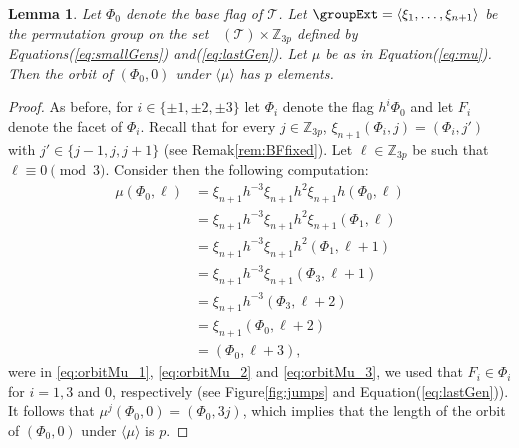 \documentclass[final]{amsart}
\theoremstyle{plain}
\newtheorem{lem}[thm]{Lemma}
\theoremstyle{definition}
\theoremstyle{remark}
\numberwithin{equation}{section}
\renewcommand{\{}{\lbrace}
\renewcommand{\}}{\rbrace}
\newcommand{\bZ}{\mathbb{Z}}
\newcommand{\cT}{\mathcal{T}}
\DeclareMathOperator{\Fw}{\mathcal{F}^{w}}
\newcommand{\kng}{{h}}
\newcommand{\te}{\xi}
\begin{document}
\begin{lem}\label{lem:orbitMu}
 Let $\Phi_{0}$ denote the base flag of $\cT$. Let $\groupExt = \left\langle \te_{1}, \dots, \te_{n+1} \right\rangle $ be the permutation group on the set $\Fw(\cT) \times \bZ_{3p}$ defined by Equations\nobreakspace \textup {(\ref {eq:smallGens})} and\nobreakspace  \textup {(\ref {eq:lastGen})}.
 Let $\mu$ be as in Equation\nobreakspace \textup {(\ref {eq:mu})}.
 Then the orbit of $(\Phi_{0}, 0)$ under $\langle \mu \rangle$ has $p$ elements.
\end{lem}
\begin{proof} 
    As before, for $i\in\{\pm1, \pm 2, \pm 3\}$ let $\Phi_i$ denote the flag $\kng^{i}\Phi_0$ and let $F_i$ denote the facet of $\Phi_i$.
    Recall that for every $j  \in \bZ_{3p}$,  $\te_{n+1}(\Phi_{i},j) = (\Phi_{i},j')$ with $j' \in \{j-1, j , j+1\}$ (see Remak\nobreakspace \ref {rem:BFfixed}).
    Let $\ell \in \bZ_{3p}$ be such that $\ell \equiv 0 \pmod{3}$.
  Consider then the following computation:
\begin{subequations}
 \begin{align}
  \mu(\Phi_{0},\ell)
  &= \te_{n+1} \kng^{-3} \te_{n+1} \kng^{2} \te_{n+1} \kng (\Phi_{0}, \ell) \nonumber \\
  &= \te_{n+1} \kng^{-3} \te_{n+1} \kng^{2} \te_{n+1} (\Phi_{1}, \ell)  \nonumber \\
  &= \te_{n+1} \kng^{-3} \te_{n+1} \kng^{2}  (\Phi_{1}, \ell+1)  \label{eq:orbitMu_1}  \\
&= \te_{n+1} \kng^{-3} \te_{n+1}  (\Phi_{3}, \ell+1)  \nonumber  \\
  &= \te_{n+1} \kng^{-3}   (\Phi_{3}, \ell+2)   \label{eq:orbitMu_2} \\
&= \te_{n+1}   ( \Phi_{0}, \ell+2)  \nonumber \\
  &= (\Phi_{0}, \ell+3),  \label{eq:orbitMu_3} 
\end{align}
\end{subequations}
were in \eqref{eq:orbitMu_1}, \eqref{eq:orbitMu_2} and \eqref{eq:orbitMu_3}, we used that $F_{i} \in \Phi_{i}$ for $i = 1, 3$ and $0$, respectively (see Figure\nobreakspace \ref {fig:jumps}
 and Equation\nobreakspace \textup {(\ref {eq:lastGen})}).
 It follows that $\mu^{j}(\Phi_0, 0) = (\Phi_0, 3 j)$, which implies that the length of the orbit of $(\Phi_0, 0)$ under $\langle \mu \rangle$ is $p$.
\end{proof}
\end{document}
